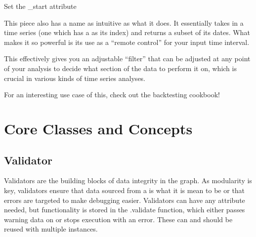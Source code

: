 \documentclass[letterpaper,10pt,english]{sphinxmanual}
\begin{document}
\begin{fulllineitems}
\begin{fulllineitems}
\end{fulllineitems}


\begin{fulllineitems}
\label{\detokenize{beginners-guide:dalio.pipe.select.DateSelect.set_start}}
Set the \_start attribute

\end{fulllineitems}


\end{fulllineitems}


This piece also has a name as intuitive as what it does. It essentially takes in a time series  (one which has a  as its index) and returns a subset of its dates. What makes it so powerful is its use as a “remote control” for your input time interval.

This effectively gives you an adjustable “filter” that can be adjusted at any point of your analysis to decide what section of the data to perform it on, which is crucial in various kinds of time series analyses.

For an interesting use case of this, check out the backtesting cookbook!


\section{Core Classes and Concepts}
\label{\detokenize{developers-guide:core-classes-and-concepts}}\label{\detokenize{developers-guide:developers-guide}}\label{\detokenize{developers-guide::doc}}

\subsection{Validator}
\label{\detokenize{developers-guide:validator}}\label{\detokenize{developers-guide:id1}}
Validators are the building blocks of data integrity in the graph. As modularity is key, validators ensure that data sourced from a  is what it is mean to be or that errors are targeted to make debugging easier. Validators can have any attribute needed, but functionality is stored in the .validate function, which either passes warning data on or stops execution with an error. These can and should be reused with multiple  instances.
\end{document}
